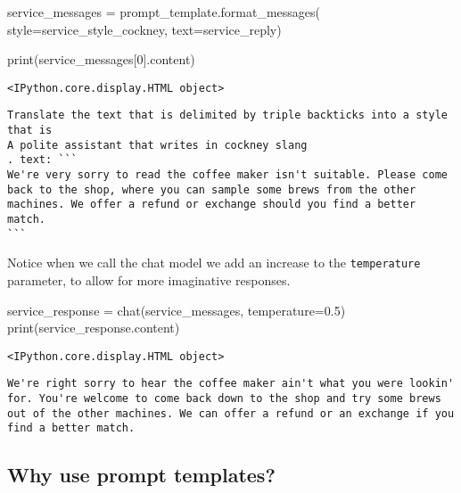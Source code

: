 \documentclass[
  letterpaper,
  DIV=11,
  numbers=noendperiod]{scrreprt}
\newenvironment{Shaded}{\begin{snugshade}}{\end{snugshade}}
\newcommand{\BuiltInTok}[1]{\textcolor[rgb]{0.00,0.23,0.31}{#1}}
\newcommand{\DecValTok}[1]{\textcolor[rgb]{0.68,0.00,0.00}{#1}}
\newcommand{\FloatTok}[1]{\textcolor[rgb]{0.68,0.00,0.00}{#1}}
\newcommand{\NormalTok}[1]{\textcolor[rgb]{0.00,0.23,0.31}{#1}}
\newcommand{\OperatorTok}[1]{\textcolor[rgb]{0.37,0.37,0.37}{#1}}
\begin{document}
\begin{Shaded}
\begin{Highlighting}[]
\NormalTok{service\_messages }\OperatorTok{=}\NormalTok{ prompt\_template.format\_messages(}
\NormalTok{    style}\OperatorTok{=}\NormalTok{service\_style\_cockney,}
\NormalTok{    text}\OperatorTok{=}\NormalTok{service\_reply)}

\BuiltInTok{print}\NormalTok{(service\_messages[}\DecValTok{0}\NormalTok{].content)}
\end{Highlighting}
\end{Shaded}

\begin{verbatim}
<IPython.core.display.HTML object>
\end{verbatim}

\begin{verbatim}
Translate the text that is delimited by triple backticks into a style that is 
A polite assistant that writes in cockney slang
. text: ```
We're very sorry to read the coffee maker isn't suitable. Please come back to the shop, where you can sample some brews from the other machines. We offer a refund or exchange should you find a better match.
```
\end{verbatim}

Notice when we call the chat model we add an increase to the
\texttt{temperature} parameter, to allow for more imaginative responses.

\begin{Shaded}
\begin{Highlighting}[]
\NormalTok{service\_response }\OperatorTok{=}\NormalTok{ chat(service\_messages, temperature}\OperatorTok{=}\FloatTok{0.5}\NormalTok{)}
\BuiltInTok{print}\NormalTok{(service\_response.content)}
\end{Highlighting}
\end{Shaded}

\begin{verbatim}
<IPython.core.display.HTML object>
\end{verbatim}

\begin{verbatim}
We're right sorry to hear the coffee maker ain't what you were lookin' for. You're welcome to come back down to the shop and try some brews out of the other machines. We can offer a refund or an exchange if you find a better match.
\end{verbatim}

\hypertarget{why-use-prompt-templates}{%
\subsection{Why use prompt templates?}\label{why-use-prompt-templates}}
\end{document}
